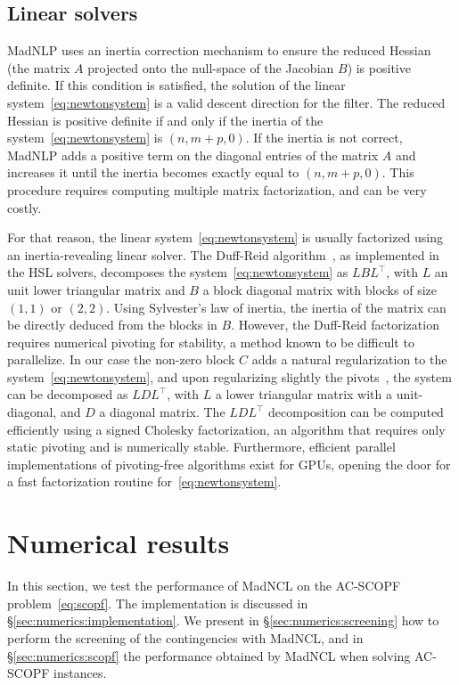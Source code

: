 \documentclass{IEEEtran4PSCC}
\newcommand{\add}[1]{#1}
\begin{document}
\subsection{Linear solvers}
\label{sec:algo:linsolvers}
\add{
MadNLP uses an inertia correction mechanism to ensure the reduced Hessian
(the matrix $A$ projected onto the null-space of the Jacobian $B$) is positive definite.
If this condition is satisfied, the solution of the linear system~\eqref{eq:newtonsystem} is a valid descent direction for the filter. The reduced Hessian is positive definite if and only if the inertia
of the system~\eqref{eq:newtonsystem} is $(n, m+p, 0)$.
If the inertia is not correct, MadNLP adds a positive term on the diagonal
entries of the matrix $A$ and increases it until the inertia becomes exactly equal to $(n, m+p, 0)$.
This procedure requires computing multiple matrix factorization, and can be very costly.

For that reason, the linear system~\eqref{eq:newtonsystem} is usually factorized using an inertia-revealing
linear solver. The Duff-Reid algorithm~\cite{duff1983multifrontal}, as implemented in the HSL solvers,
decomposes the system~\eqref{eq:newtonsystem} as
$L B L^\top$, with $L$ an unit lower triangular matrix and $B$ a block diagonal matrix
with blocks of size $(1, 1)$ or $(2, 2)$. Using Sylvester's law of inertia,
the inertia of the matrix can be directly deduced from the blocks in $B$.
However, the Duff-Reid factorization requires numerical pivoting for
stability, a method known to be difficult to parallelize.
In our
case the non-zero block $C$ adds a natural regularization to the
system~\eqref{eq:newtonsystem}, and upon regularizing slightly the pivots~\cite{montoison2025madncl},
the system can be decomposed as $LDL^\top$, with $L$ a lower triangular matrix with a
unit-diagonal, and $D$ a diagonal matrix. The $LDL^\top$ decomposition can be computed
efficiently using a signed Cholesky factorization, an algorithm that requires only
static pivoting and is numerically stable.
Furthermore, efficient parallel implementations of pivoting-free algorithms exist for GPUs,
opening the door for a fast factorization routine for~\eqref{eq:newtonsystem}.
}


\section{Numerical results}
In this section, we test the performance of MadNCL on the AC-SCOPF problem~\eqref{eq:scopf}.
The implementation is discussed in \S\ref{sec:numerics:implementation}. We present
in \S\ref{sec:numerics:screening} how to perform the screening of the contingencies
with MadNCL, and in \S\ref{sec:numerics:scopf} the performance obtained by MadNCL when
solving AC-SCOPF instances.
\end{document}
